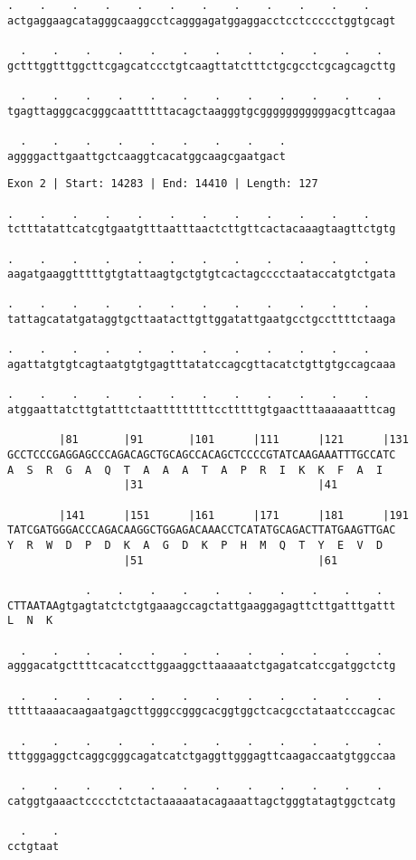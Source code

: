 \documentclass{article}
\begin{document}
\newpage
\begin{Verbatim}[fontfamily=courier]
  .    .    .    .    .    .    .    .    .    .    .    .  
actgaggaagcatagggcaaggcctcagggagatggaggacctcctccccctggtgcagt

  .    .    .    .    .    .    .    .    .    .    .    .  
gctttggtttggcttcgagcatccctgtcaagttatctttctgcgcctcgcagcagcttg

  .    .    .    .    .    .    .    .    .    .    .    .  
tgagttagggcacgggcaattttttacagctaagggtgcgggggggggggacgttcagaa

  .    .    .    .    .    .    .    .    .
aggggacttgaattgctcaaggtcacatggcaagcgaatgact
\end{Verbatim}
\newpage
\begin{Verbatim}[fontfamily=courier]
Exon 2 | Start: 14283 | End: 14410 | Length: 127

.    .    .    .    .    .    .    .    .    .    .    .    
tctttatattcatcgtgaatgtttaatttaactcttgttcactacaaagtaagttctgtg

.    .    .    .    .    .    .    .    .    .    .    .    
aagatgaaggtttttgtgtattaagtgctgtgtcactagcccctaataccatgtctgata

.    .    .    .    .    .    .    .    .    .    .    .    
tattagcatatgataggtgcttaatacttgttggatattgaatgcctgccttttctaaga

.    .    .    .    .    .    .    .    .    .    .    .    
agattatgtgtcagtaatgtgtgagtttatatccagcgttacatctgttgtgccagcaaa

.    .    .    .    .    .    .    .    .    .    .    .    
atggaattatcttgtatttctaatttttttttcctttttgtgaactttaaaaaatttcag

        |81       |91       |101      |111      |121      |131
GCCTCCCGAGGAGCCCAGACAGCTGCAGCCACAGCTCCCCGTATCAAGAAATTTGCCATC
A  S  R  G  A  Q  T  A  A  A  T  A  P  R  I  K  K  F  A  I  
                  |31                           |41         

        |141      |151      |161      |171      |181      |191
TATCGATGGGACCCAGACAAGGCTGGAGACAAACCTCATATGCAGACTTATGAAGTTGAC
Y  R  W  D  P  D  K  A  G  D  K  P  H  M  Q  T  Y  E  V  D  
                  |51                           |61         

            .    .    .    .    .    .    .    .    .    .  
CTTAATAAgtgagtatctctgtgaaagccagctattgaaggagagttcttgatttgattt
L  N  K                                                     

  .    .    .    .    .    .    .    .    .    .    .    .  
agggacatgcttttcacatccttggaaggcttaaaaatctgagatcatccgatggctctg

  .    .    .    .    .    .    .    .    .    .    .    .  
tttttaaaacaagaatgagcttgggccgggcacggtggctcacgcctataatcccagcac

  .    .    .    .    .    .    .    .    .    .    .    .  
tttgggaggctcaggcgggcagatcatctgaggttgggagttcaagaccaatgtggccaa

  .    .    .    .    .    .    .    .    .    .    .    .  
catggtgaaactcccctctctactaaaaatacagaaattagctgggtatagtggctcatg

  .    .
cctgtaat
\end{Verbatim}
\end{document}
